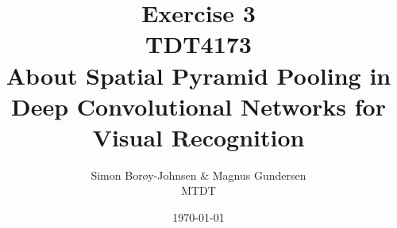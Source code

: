 \documentclass{article}
\begin{document}

\title{\textbf{Exercise 3} \\ TDT4173 \\ About Spatial Pyramid Pooling in Deep Convolutional Networks for Visual Recognition}
\author{Simon Borøy-Johnsen \& Magnus Gundersen \\ MTDT}
\date{\today}
\maketitle
\clearpage




\clearpage
\printbibliography
\end{document}

